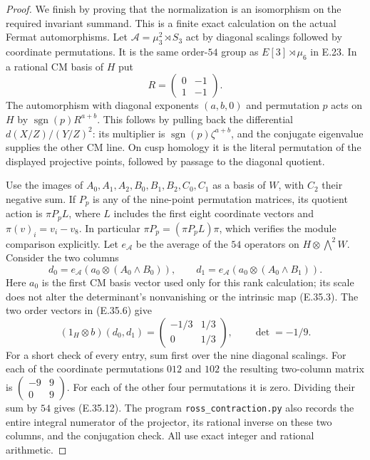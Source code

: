 \begin{proof}
We finish by proving that the normalization
is an isomorphism on the required invariant
summand. This is a finite exact calculation
on the actual Fermat automorphisms. Let
$\mathcal A=\mu_3^2\rtimes S_3$ act by
diagonal scalings followed by coordinate
permutations. It is the same order-$54$ group
as $E[3]\rtimes\mu_6$ in E.23. In a rational
CM basis of $H$ put
\[
 R=\begin{pmatrix}0&-1\\1&-1\end{pmatrix}.
\]
The automorphism with diagonal exponents
$(a,b,0)$ and permutation $p$ acts on $H$ by
$\operatorname{sgn}(p)R^{a+b}$. This follows
by pulling back the differential
$d(X/Z)/(Y/Z)^2$: its multiplier is
$\operatorname{sgn}(p)\zeta^{a+b}$, and the
conjugate eigenvalue supplies the other CM
line. On cusp homology it is the literal
permutation of the displayed projective
points, followed by passage to the diagonal
quotient.

Use the images of
$A_0,A_1,A_2,B_0,B_1,B_2,C_0,C_1$ as a basis
of $W$, with $C_2$ their negative sum. If $P_p$
is any of the nine-point permutation matrices,
its quotient action is $\pi P_p L$, where
$L$ includes the first eight coordinate vectors
and $\pi(v)_i=v_i-v_8$. In particular
$\pi P_p=(\pi P_pL)\pi$, which verifies the
module comparison explicitly.
Let $e_{\mathcal A}$ be the average of the
$54$ operators on $H\otimes\bigwedge^2W$.
Consider the two columns
\[
 d_0=e_{\mathcal A}(a_0\otimes(A_0\wedge B_0)),
 \qquad
 d_1=e_{\mathcal A}(a_0\otimes(A_0\wedge B_1)).
\]
Here $a_0$ is the first CM basis vector used
only for this rank calculation; its scale does
not alter the determinant's nonvanishing or
the intrinsic map (E.35.3). The two order vectors
in (E.35.6) give
\[
 (1_H\otimes b)(d_0,d_1)=
     \begin{pmatrix}-1/3&1/3\\0&1/3\end{pmatrix},
 \qquad \det=-1/9.
 \tag{E.35.12}
\]
For a short check of every entry, sum first
over the nine diagonal scalings. For each of
the coordinate permutations $012$ and $102$
the resulting two-column matrix is
$\left(\begin{smallmatrix}-9&9\\0&9\end{smallmatrix}\right)$.
For each of the other four permutations it
is zero. Dividing their sum by $54$ gives
(E.35.12). The program
\texttt{ross\_contraction.py} also records the
entire integral numerator of the projector,
its rational inverse on these two columns,
and the conjugation check. All use exact
integer and rational arithmetic.


\end{proof}
